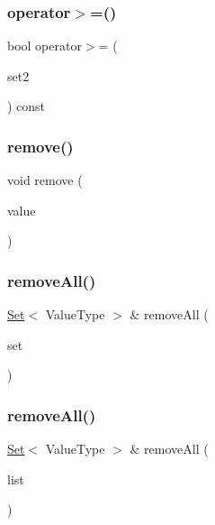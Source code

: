 \mbox{\label{classSet_a57ba3133542a03f89b25503a5486cb77}} 
\subsubsection{\texorpdfstring{operator$>$=()}{operator>=()}}
{\footnotesize\ttfamily bool operator$>$= (\begin{DoxyParamCaption}\item[{const \mbox{\hyperlink{classSet}{Set}}$<$ Value\+Type $>$ \&}]{set2 }\end{DoxyParamCaption}) const}

\mbox{\label{classSet_ab8213d15b557acafdd461c231e9ade3b}} 
\subsubsection{\texorpdfstring{remove()}{remove()}}
{\footnotesize\ttfamily void remove (\begin{DoxyParamCaption}\item[{const Value\+Type \&}]{value }\end{DoxyParamCaption})}

\mbox{\label{classSet_a166c0388f87629ba27b00852f4a9a9f2}} 
\subsubsection{\texorpdfstring{remove\+All()}{removeAll()}\hspace{0.1cm}{\footnotesize\ttfamily [1/2]}}
{\footnotesize\ttfamily \mbox{\hyperlink{classSet}{Set}}$<$ Value\+Type $>$ \& remove\+All (\begin{DoxyParamCaption}\item[{const \mbox{\hyperlink{classSet}{Set}}$<$ Value\+Type $>$ \&}]{set }\end{DoxyParamCaption})}

\mbox{\label{classSet_a803c5b6d1e6b33cc7359ff2018d8822a}} 
\subsubsection{\texorpdfstring{remove\+All()}{removeAll()}\hspace{0.1cm}{\footnotesize\ttfamily [2/2]}}
{\footnotesize\ttfamily \mbox{\hyperlink{classSet}{Set}}$<$ Value\+Type $>$ \& remove\+All (\begin{DoxyParamCaption}\item[{std\+::initializer\+\_\+list$<$ Value\+Type $>$}]{list }\end{DoxyParamCaption})}

